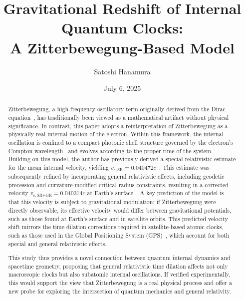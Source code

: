 \documentclass[%
 reprint,
 amsmath,amssymb,
 aps,
]{revtex4-1}
\numberwithin{equation}{section}%
\begin{document}


\title{Gravitational Redshift of Internal Quantum Clocks:\\ A Zitterbewegung-Based Model}
\author{Satoshi Hanamura}
\date{July 6, 2025}


\begin{abstract}
Zitterbewegung, a high-frequency oscillatory term originally derived from the Dirac equation~\cite{dirac1928}, has traditionally been viewed as a mathematical artifact without physical significance. In contrast, this paper adopts a reinterpretation of Zitterbewegung as a physically real internal motion of the electron. Within this framework, the internal oscillation is confined to a compact photonic shell structure governed by the electron's Compton wavelength~\cite{compton1923} and evolves according to the proper time of the system. Building on this model, the author has previously derived a special relativistic estimate for the mean internal velocity, yielding $v_{e,\text{SR}} = 0.040472c$~\cite{hanamura2309.0047}. This estimate was subsequently refined by incorporating general relativistic effects, including geodetic precession and curvature-modified critical radius constraints, resulting in a corrected velocity $v_{e,\text{SR+GR}} = 0.040374c$ at Earth's surface~\cite{hanamura2501.0130}. A key prediction of the model is that this velocity is subject to gravitational modulation: if Zitterbewegung were directly observable, its effective velocity would differ between gravitational potentials, such as those found at Earth's surface and in satellite orbits. This predicted velocity shift mirrors the time dilation corrections required in satellite-based atomic clocks, such as those used in the Global Positioning System (GPS)~\cite{ashby2003}, which account for both special and general relativistic effects.

This study thus provides a novel connection between quantum internal dynamics and spacetime geometry, proposing that general relativistic time dilation affects not only macroscopic clocks but also subatomic internal oscillations. If verified experimentally, this would support the view that Zitterbewegung is a real physical process and offer a new probe for exploring the intersection of quantum mechanics and general relativity.
\end{abstract}
\end{document}
